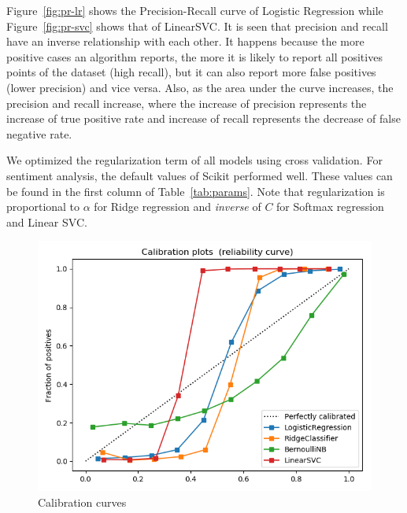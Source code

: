Figure~\ref{fig:pr-lr} shows the Precision-Recall curve of Logistic Regression while Figure~\ref{fig:pr-svc} shows that of LinearSVC. It is seen that precision and recall have an inverse relationship with each other. It happens because the more positive cases an algorithm reports, the more it is likely to report all positives points of the dataset (high recall), but it can also report more false positives (lower precision) and vice versa. Also, as the area under the curve increases, the precision and recall increase, where the increase of precision represents the increase of true positive rate and increase of recall represents the decrease of false negative rate. 
 
We optimized the regularization term of all models using cross validation. For sentiment analysis, the default values of Scikit performed well. These values can be found in the first column of Table~\ref{tab:params}. Note that regularization is proportional to $\alpha$ for Ridge regression and \textit{inverse} of $C$ for Softmax regression and Linear SVC.

\begin{figure}[tbh]%
\centering
\includegraphics[width=0.9\columnwidth]{figures/calibration.png}%
\caption{Calibration curves}%
\label{fig:calibration}%
\end{figure}

